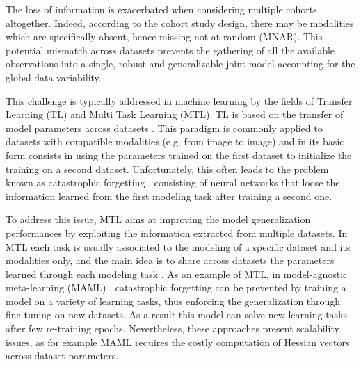 The loss of information is exacerbated when considering multiple cohorts altogether.
Indeed, according to the cohort study design, there may be modalities which are specifically absent, hence missing not at random (MNAR).
This potential mismatch across datasets prevents the gathering of all the available observations into a single, robust and generalizable joint model accounting for the global data variability.

This challenge is typically addressed in machine learning by the fields of Transfer Learning (TL) and Multi Task Learning (MTL).
TL is based on the transfer of model parameters across datasets \citep{TL}.
This paradigm is commonly applied to datasets with compatible modalities (e.g. from image to image) and in its basic form consists in using the parameters trained on the first dataset to initialize the training on a second dataset.
Unfortunately, this often leads to the problem known as catastrophic forgetting \citep{CatastroficForgetting}, consisting of neural networks that loose the information learned from the first modeling task after training a second one.

To address this issue, MTL aims at improving the model generalization performances by exploiting the information extracted from multiple datasets.
In MTL each task is usually associated to the modeling of a specific dataset and its modalities only,
and the main idea is to share across datasets the parameters learned through each modeling task \citep{Caruana1998, Dorado-Moreno2020}.
As an example of MTL, in model-agnostic meta-learning (MAML) \citep{MAML1}, catastrophic forgetting can be prevented by training a model on a variety of learning tasks, thus enforcing the generalization through fine tuning on new datasets.
As a result this model can solve new learning tasks after few re-training epochs.
Nevertheless, these approaches present scalability issues, as for example MAML requires the costly computation of Hessian vectors across dataset parameters.

